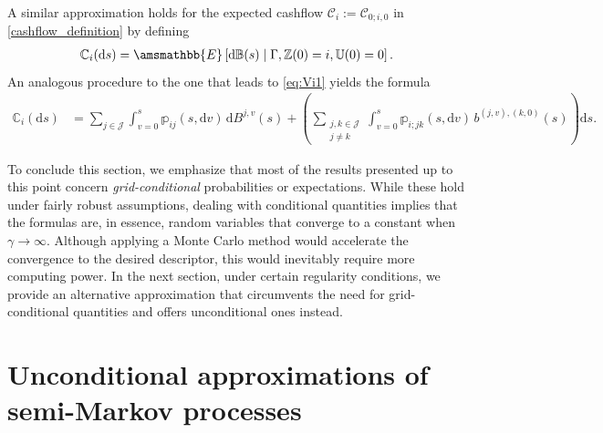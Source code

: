 \documentclass[11pt,leqno]{amsart}
\numberwithin{table}{section}
\numberwithin{figure}{section}
\numberwithin{equation}{section}
\newcommand{\dd}{\mathrm{d}}
\newcommand{\1}{{\mathds{1}}}
\newcommand{\0}{\mat{0}}
\newcommand{\E}{\amsmathbb{E}}
\newcommand{\ap}[1]{\mathbb{#1}}
\begin{document}
{
A similar approximation holds for the expected cashflow { $\mathcal{C}_i:=\mathcal{C}_{0;i,0}$} in \eqref{cashflow_definition} by defining
\begin{align*}
\ap{C}_i(\dd s) = \E\left[\dd \ap{B}(s) \mid \Gamma, { \ap{Z}(0) = i, \ap{U}(0) = 0}\right].
\end{align*}
An analogous procedure to the one that leads to \eqref{eq:Vi1} yields the formula
\begin{align}\label{cashflow_approximation}
\ap{C}_{i}(\dd s) &= \sum_{j \in \mathcal{J}} \int_{v=0}^s \ap{p}_{ij}(s, \dd v) \, \dd B^{j,v}(s) + \left( \sum_{\substack{j,k \in \mathcal{J} \\ j \neq k}} \int_{v=0}^s \ap{p}_{i;jk}(s, \dd v) \, b^{(j,v),(k,0)}(s) \right) \dd s.
\end{align}
}

To conclude this section, we emphasize that most of the results presented up to this point concern \emph{grid-conditional} probabilities or expectations. While these hold under fairly robust assumptions, dealing with conditional quantities implies that the formulas are, in essence, random variables that converge to a constant when $\gamma\rightarrow \infty$. Although applying a Monte Carlo method would accelerate the convergence to the desired descriptor, this would inevitably require more computing power. In the next section, under certain regularity conditions, we provide an alternative approximation that circumvents the need for grid-conditional quantities and offers unconditional ones instead.

\section{Unconditional approximations of semi-Markov processes}\label{sec:unconditional} 
\end{document}
